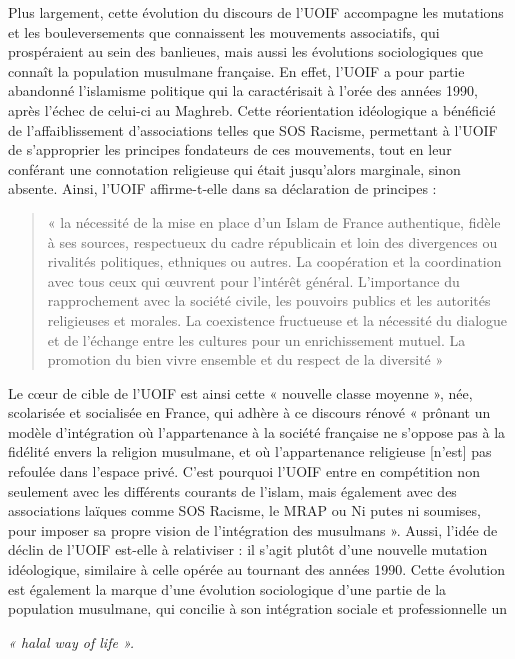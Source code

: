 Plus largement, cette évolution du discours de l'UOIF accompagne les
mutations et les bouleversements que connaissent les mouvements
associatifs, qui prospéraient au sein des banlieues, mais aussi les
évolutions sociologiques que connaît la population musulmane française.
En effet, l'UOIF a pour partie abandonné l'islamisme politique qui la
caractérisait à l'orée des années 1990, après l'échec de celui-ci au
Maghreb. Cette réorientation idéologique a bénéficié de
l'affaiblissement d'associations telles que SOS Racisme, permettant à
l'UOIF de s'approprier les principes fondateurs de ces mouvements, tout
en leur conférant une connotation religieuse qui était jusqu'alors
marginale, sinon absente. Ainsi, l'UOIF affirme-t-elle dans sa
déclaration de principes :
\begin{quote}
    « la nécessité de la mise en place d'un Islam de France authentique,
fidèle à ses sources, respectueux du cadre républicain et loin des
divergences ou rivalités politiques, ethniques ou autres. La coopération
et la coordination avec tous ceux qui œuvrent pour l'intérêt général.
L'importance du rapprochement avec la société civile, les pouvoirs
publics et les autorités religieuses et morales. La coexistence
fructueuse et la nécessité du dialogue et de l'échange entre les
cultures pour un enrichissement mutuel. La promotion du bien vivre
ensemble et du respect de la diversité »
\end{quote}


Le cœur de cible de l'UOIF est ainsi cette « nouvelle classe moyenne »,
née, scolarisée et socialisée en France, qui adhère à ce discours rénové
« prônant un modèle d'intégration où l'appartenance à la société
française ne s'oppose pas à la fidélité envers la religion musulmane, et
où l'appartenance religieuse {[}n'est{]} pas refoulée dans l'espace
privé. C'est pourquoi l'UOIF entre en compétition non seulement avec les
différents courants de l'islam, mais également avec des associations
laïques comme SOS Racisme, le MRAP ou Ni putes ni soumises, pour imposer
sa propre vision de l'intégration des musulmans ». Aussi, l'idée de
déclin de l'UOIF est-elle à relativiser : il s'agit plutôt d'une
nouvelle mutation idéologique, similaire à celle opérée au tournant des
années
1990. Cette évolution est également la marque d'une évolution
sociologique d'une partie de la population musulmane, qui concilie à son
intégration sociale et professionnelle un

\emph{« halal way of life ».}

